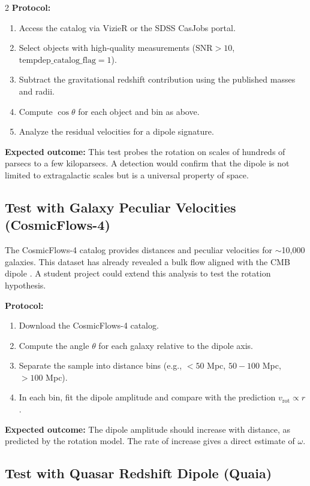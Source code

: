 \documentclass[12pt,a4paper]{article}
\begin{document}
\begin{multicols}{2}
		\textbf{Protocol:}
		\begin{enumerate}
			\item Access the catalog via VizieR or the SDSS CasJobs portal.
			\item Select objects with high-quality measurements (\(\mathrm{SNR} > 10\), \(\mathrm{tempdep\_catalog\_flag} = 1\)).
			\item Subtract the gravitational redshift contribution using the published masses and radii.
			\item Compute \(\cos\theta\) for each object and bin as above.
			\item Analyze the residual velocities for a dipole signature.
		\end{enumerate}
		
		\textbf{Expected outcome:} This test probes the rotation on scales of hundreds of parsecs to a few kiloparsecs. A detection would confirm that the dipole is not limited to extragalactic scales but is a universal property of space.
		
		\subsection{Test with Galaxy Peculiar Velocities (CosmicFlows-4)}
		
		The CosmicFlows-4 catalog provides distances and peculiar velocities for \(\sim\)10,000 galaxies. This dataset has already revealed a bulk flow aligned with the CMB dipole \cite{Watkins2023}. A student project could extend this analysis to test the rotation hypothesis.
		
		\textbf{Protocol:}
		\begin{enumerate}
			\item Download the CosmicFlows-4 catalog.
			\item Compute the angle \(\theta\) for each galaxy relative to the dipole axis.
			\item Separate the sample into distance bins (e.g., \(<50\) Mpc, \(50-100\) Mpc, \(>100\) Mpc).
			\item In each bin, fit the dipole amplitude and compare with the prediction \(v_{\mathrm{rot}} \propto r\).
		\end{enumerate}
		
		\textbf{Expected outcome:} The dipole amplitude should increase with distance, as predicted by the rotation model. The rate of increase gives a direct estimate of \(\omega\).
		
		\subsection{Test with Quasar Redshift Dipole (Quaia)}
		

\end{multicols}
\end{document}
